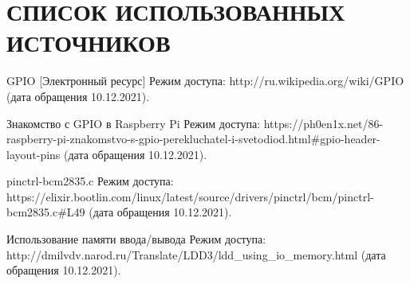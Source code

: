 \section*{СПИСОК ИСПОЛЬЗОВАННЫХ ИСТОЧНИКОВ}

\begingroup
\renewcommand{\section}[2]{}
\begin{thebibliography}{}
	 GPIO [Электронный ресурс] Режим доступа: http://ru.wikipedia.org/wiki/GPIO (дата обращения 10.12.2021).
	
	 Знакомство с GPIO в Raspberry Pi Режим доступа: https://ph0en1x.net/86-raspberry-pi-znakomstvo-s-gpio-perekluchatel-i-svetodiod.html#gpio-header-layout-pins (дата обращения 10.12.2021).
	
	 pinctrl-bcm2835.c Режим доступа: https://elixir.bootlin.com/linux/latest/source/drivers/pinctrl/bcm/pinctrl-bcm2835.c#L49 (дата обращения 10.12.2021).
	
	 Использование памяти ввода/вывода Режим доступа: http://dmilvdv.narod.ru/Translate/LDD3/ldd\_using\_io\_memory.html (дата обращения 10.12.2021).
	
\end{thebibliography}
\endgroup

\pagebreak